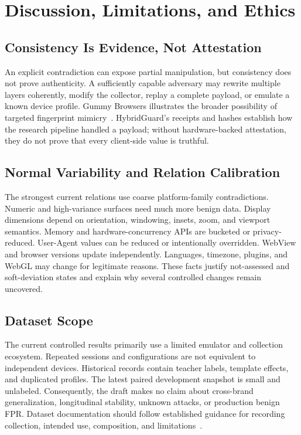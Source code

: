 \section{Discussion, Limitations, and Ethics}
\label{sec:discussion}

\subsection{Consistency Is Evidence, Not Attestation}

An explicit contradiction can expose partial manipulation, but consistency does not prove authenticity. A sufficiently capable adversary may rewrite multiple layers coherently, modify the collector, replay a complete payload, or emulate a known device profile. Gummy Browsers illustrates the broader possibility of targeted fingerprint mimicry~\cite{liu2022gummy}. HybridGuard's receipts and hashes establish how the research pipeline handled a payload; without hardware-backed attestation, they do not prove that every client-side value is truthful.

\subsection{Normal Variability and Relation Calibration}

The strongest current relations use coarse platform-family contradictions. Numeric and high-variance surfaces need much more benign data. Display dimensions depend on orientation, windowing, insets, zoom, and viewport semantics. Memory and hardware-concurrency APIs are bucketed or privacy-reduced. User-Agent values can be reduced or intentionally overridden. WebView and browser versions update independently. Languages, timezone, plugins, and WebGL may change for legitimate reasons. These facts justify not-assessed and soft-deviation states and explain why several controlled changes remain uncovered.

\subsection{Dataset Scope}

The current controlled results primarily use a limited emulator and collection ecosystem. Repeated sessions and configurations are not equivalent to independent devices. Historical records contain teacher labels, template effects, and duplicated profiles. The latest paired development snapshot is small and unlabeled. Consequently, the draft makes no claim about cross-brand generalization, longitudinal stability, unknown attacks, or production benign FPR. Dataset documentation should follow established guidance for recording collection, intended use, composition, and limitations~\cite{gebru2021datasheets,pushkarna2022datacards}.

